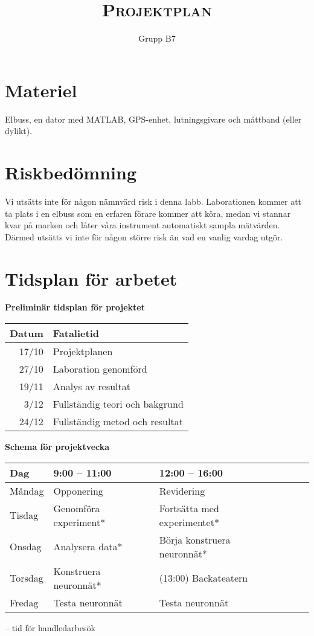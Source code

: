 \documentclass[]{article}
\title{{\huge \textsc{Projektplan}}}
\author{Grupp B7}
\begin{document}
\maketitle
{}
\tableofcontents
\cleardoublepage
{}



\section{Materiel}
Elbuss, en dator med MATLAB, GPS-enhet, lutningsgivare och
måttband (eller dylikt).



\section{Riskbedömning}
Vi utsätts inte för någon nämnvärd risk i denna labb.
Laborationen kommer att ta plats i en elbuss som en erfaren förare kommer att köra,
medan vi stannar kvar på marken och låter våra instrument automatiskt sampla mätvärden.
Därmed utsätts vi inte för någon större risk än vad en vanlig vardag utgör.

\section{Tidsplan för arbetet}
\begin{center}
	\textbf{Preliminär tidsplan för projektet} \par
	\begin{tabular}{r | l}
		Datum & Fatalietid \\ \hline
		17/10 & Projektplanen \\
		27/10 & Laboration genomförd \\
		19/11 & Analys av resultat \\
		3/12 & Fullständig teori och bakgrund \\
		24/12 & Fullständig metod och resultat \\
		\hline
	\end{tabular} \par

	\vspace{0.75cm}

	\textbf{Schema för projektvecka} \par
	\begin{tabular}{l | l l l l l}
		Dag & 9:00 -- 11:00 & 12:00 -- 16:00 \\ \hline
		Måndag & Opponering & Revidering \\
		Tisdag & Genomföra experiment* & Fortsätta med experimentet* \\
		Onsdag & Analysera data* & Börja konstruera neuronnät* \\
		Torsdag & Konstruera neuronnät* & (13:00) Backateatern \\
		Fredag & Testa neuronnät & Testa neuronnät \\
		\hline
	\end{tabular} \par
	\hfill {\scriptsize * -- tid för handledarbesök}
\end{center}

\clearpage
\printbibliography
\end{document}
